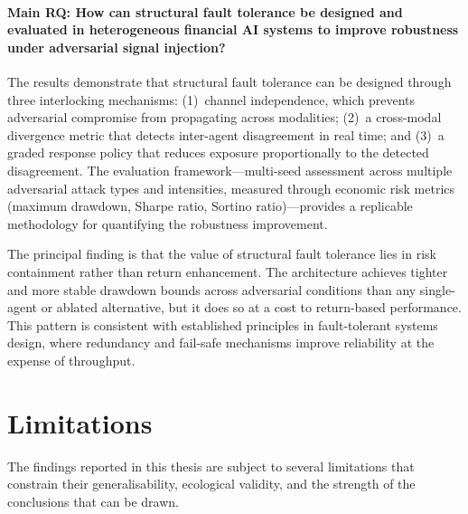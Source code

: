 \paragraph{Main RQ: How can structural fault tolerance be designed and
evaluated in heterogeneous financial AI systems to improve robustness under
adversarial signal injection?}

The results demonstrate that structural fault tolerance can be designed through
three interlocking mechanisms: (1)~channel independence, which prevents
adversarial compromise from propagating across modalities; (2)~a cross-modal
divergence metric that detects inter-agent disagreement in real time; and
(3)~a graded response policy that reduces exposure proportionally to the
detected disagreement. The evaluation framework---multi-seed assessment across
multiple adversarial attack types and intensities, measured through economic
risk metrics (maximum drawdown, Sharpe ratio, Sortino ratio)---provides a
replicable methodology for quantifying the robustness improvement.

The principal finding is that the value of structural fault tolerance lies in
risk containment rather than return enhancement. The architecture achieves
tighter and more stable drawdown bounds across adversarial conditions than
any single-agent or ablated alternative, but it does so at a cost to
return-based performance. This pattern is consistent with established
principles in fault-tolerant systems design, where redundancy and fail-safe
mechanisms improve reliability at the expense of throughput.

\section{Limitations}
\label{sec:disc-limitations}

The findings reported in this thesis are subject to several limitations that
constrain their generalisability, ecological validity, and the strength of
the conclusions that can be drawn.

